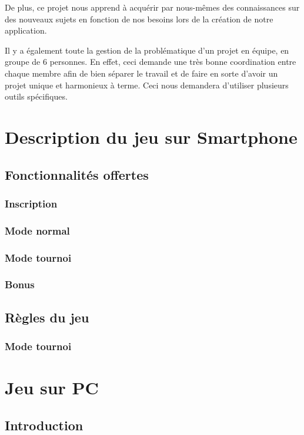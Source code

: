 \documentclass[a4paper,12pt]{article}
\begin{document}
	De plus, ce projet nous apprend à acquérir par nous-mêmes des connaissances sur des nouveaux sujets en fonction de nos besoins lors de la création de notre application. 
	
	Il y a également toute la gestion de la problématique d'un projet en équipe, en groupe de 6 personnes. En effet, ceci demande une très bonne coordination entre chaque membre afin de bien séparer le travail et de faire en sorte d'avoir un projet unique et harmonieux à terme. Ceci nous demandera d'utiliser plusieurs outils spécifiques.
	
	\section{Description du jeu sur Smartphone}
	\subsection{Fonctionnalités offertes}
	\subsubsection{Inscription}
	\subsubsection{Mode normal}
	\subsubsection{Mode tournoi}
	\subsubsection{Bonus}
	
	\subsection{Règles du jeu}
	\subsubsection{Mode tournoi}
	
	\section{Jeu sur PC}
	\subsection{Introduction}
	
\end{document}
